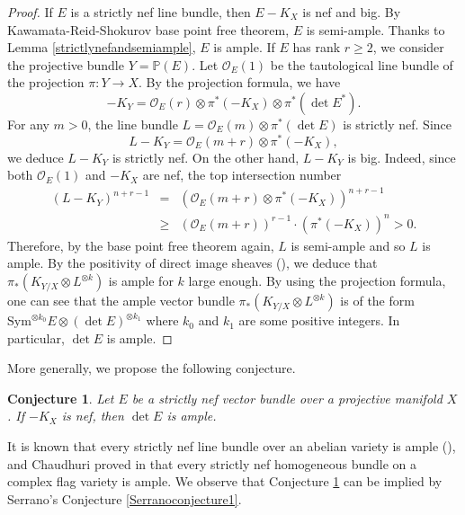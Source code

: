 \documentclass[english,reqno]{amsart}
\newcommand\bbP{{\mathbb P}}
\newcommand\sO{{\mathscr O}}
\theoremstyle{plain}
\newtheorem{conj}[thm]{Conjecture}
\theoremstyle{definition}
\numberwithin{equation}{section} %
\begin{document}
\begin{proof} If $E$ is a strictly nef line bundle, then $E-K_X$ is  nef and big. By
    Kawamata-Reid-Shokurov base point free theorem, $E$ is semi-ample. Thanks to Lemma \ref{strictlynefandsemiample}, $E$ is ample.
    If $E$ has rank
     $r\geqslant 2$,   we consider the projective bundle $Y=\bbP(E)$.  Let  $\sO_E(1)$ be the tautological line bundle of the projection $\pi:Y\rightarrow X$. By the projection
    formula, we have $$ -K_Y=\sO_E(r)\otimes \pi^*(-K_X)\otimes \pi^*(\det
    E^*).$$
     For any $m>0$, the line bundle $L=\sO_E(m)\otimes \pi^*(\det
    E)$ is strictly nef. Since $$ L-K_Y=\sO_E(m+r)\otimes \pi^*(-K_X),$$
    we deduce $L-K_Y$ is strictly nef. On the other hand, $L-K_Y$ is big. Indeed,
    since both $\sO_{E}(1)$ and $-K_X$ are nef, the top intersection number \begin{eqnarray*}  (L-K_Y)^{n+
        r-1}&=&(\sO_E(m+r)\otimes \pi^*(-K_X))^{n+r-1}\\
    &\geq &\left(\sO_{E}(m+r)\right)^{r-1} \cdot
    \left(\pi^*(-K_X)\right)^{n}>0. \end{eqnarray*}
    Therefore, by the base
    point free theorem again, $L$ is semi-ample and so $L$ is ample. By the positivity of direct image sheaves (\cite{Mourougane1997}), we deduce that $\pi_*(K_{Y/X}\otimes L^{\otimes k})$ is ample for $k$ large enough.
    By using the projection formula, one can see that  the ample vector bundle $\pi_*(K_{Y/X}\otimes L^{\otimes k})$ is of the form  $\mathrm{Sym}^{\otimes k_0}E\otimes (\det E)^{\otimes k_1}$  where  $k_0$ and $k_1$ are some positive integers. In particular, $\det E$ is
    ample.
    \end{proof}



\noindent More generally, we propose the following conjecture.

\begin{conj}\label{LOYconjecture} Let $E$ be a strictly nef vector bundle over a projective manifold $X$.   If $-K_X$ is nef, then $\det E$ is ample.
\end{conj}



\noindent  It is known that every strictly nef line bundle over an abelian variety is ample (\cite[Proposition~1.4]{Serrano1995}), and Chaudhuri proved in \cite{Chaudhuri2020} that every strictly nef homogeneous bundle
on a complex flag variety is ample. We observe that Conjecture \ref{LOYconjecture} can be implied by Serrano's Conjecture \ref{Serranoconjecture1}.
\end{document}
